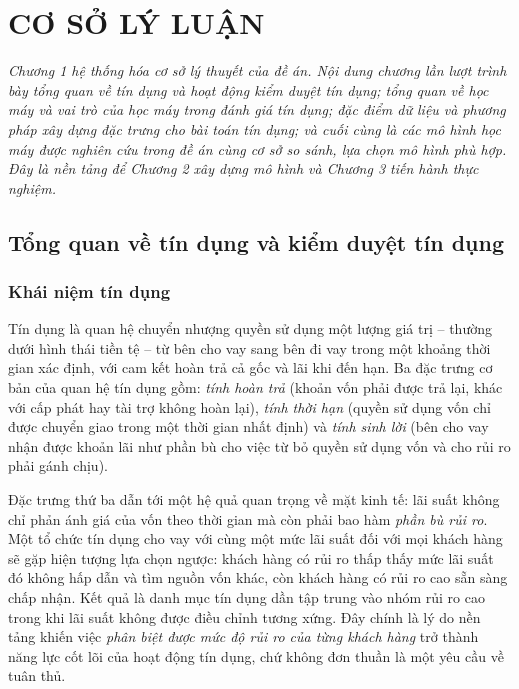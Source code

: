 \chapter{CƠ SỞ LÝ LUẬN}
\label{chap:co-so-ly-luan}

\noindent\textit{Chương 1 hệ thống hóa cơ sở lý thuyết của đề án. Nội dung chương
lần lượt trình bày tổng quan về tín dụng và hoạt động kiểm duyệt tín dụng; tổng
quan về học máy và vai trò của học máy trong đánh giá tín dụng; đặc điểm dữ liệu
và phương pháp xây dựng đặc trưng cho bài toán tín dụng; và cuối cùng là các mô
hình học máy được nghiên cứu trong đề án cùng cơ sở so sánh, lựa chọn mô hình phù
hợp. Đây là nền tảng để Chương 2 xây dựng mô hình và Chương 3 tiến hành thực
nghiệm.}

\section{Tổng quan về tín dụng và kiểm duyệt tín dụng}
\label{sec:tong-quan-tin-dung}

\subsection{Khái niệm tín dụng}
\label{subsec:khai-niem-tin-dung}

Tín dụng là quan hệ chuyển nhượng quyền sử dụng một lượng giá trị -- thường dưới
hình thái tiền tệ -- từ bên cho vay sang bên đi vay trong một khoảng thời gian
xác định, với cam kết hoàn trả cả gốc và lãi khi đến hạn. Ba đặc trưng cơ bản của
quan hệ tín dụng gồm: \textit{tính hoàn trả} (khoản vốn phải được trả lại, khác
với cấp phát hay tài trợ không hoàn lại), \textit{tính thời hạn} (quyền sử dụng
vốn chỉ được chuyển giao trong một thời gian nhất định) và \textit{tính sinh lời}
(bên cho vay nhận được khoản lãi như phần bù cho việc từ bỏ quyền sử dụng vốn và
cho rủi ro phải gánh chịu).

Đặc trưng thứ ba dẫn tới một hệ quả quan trọng về mặt kinh tế: lãi suất không chỉ
phản ánh giá của vốn theo thời gian mà còn phải bao hàm \textit{phần bù rủi ro}.
Một tổ chức tín dụng cho vay với cùng một mức lãi suất đối với mọi khách hàng sẽ
gặp hiện tượng lựa chọn ngược: khách hàng có rủi ro thấp thấy mức lãi suất đó
không hấp dẫn và tìm nguồn vốn khác, còn khách hàng có rủi ro cao sẵn sàng chấp
nhận. Kết quả là danh mục tín dụng dần tập trung vào nhóm rủi ro cao trong khi
lãi suất không được điều chỉnh tương xứng. Đây chính là lý do nền tảng khiến việc
\textit{phân biệt được mức độ rủi ro của từng khách hàng} trở thành năng lực cốt
lõi của hoạt động tín dụng, chứ không đơn thuần là một yêu cầu về tuân thủ.

